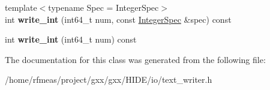 \begin{DoxyCompactItemize}
\item 
{\footnotesize template$<$typename Spec  = Integer\+Spec$>$ }\\int {\bfseries write\+\_\+int} (int64\+\_\+t num, const \hyperlink{classgxx_1_1IntegerSpec}{Integer\+Spec} \&spec) const \hypertarget{classgxx_1_1text__writer_af548844227528a190ccb6e146850b91b}{}\label{classgxx_1_1text__writer_af548844227528a190ccb6e146850b91b}

\item 
int {\bfseries write\+\_\+int} (int64\+\_\+t num) const \hypertarget{classgxx_1_1text__writer_a481e1f5ffbde61a96bd8b6b18f1fabb0}{}\label{classgxx_1_1text__writer_a481e1f5ffbde61a96bd8b6b18f1fabb0}

\end{DoxyCompactItemize}


The documentation for this class was generated from the following file\+:\begin{DoxyCompactItemize}
\item 
/home/rfmeas/project/gxx/gxx/\+H\+I\+D\+E/io/text\+\_\+writer.\+h\end{DoxyCompactItemize}
